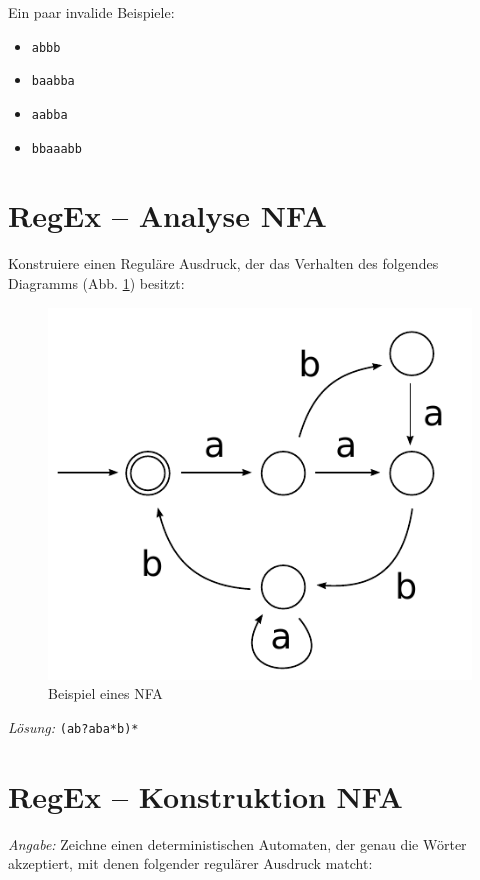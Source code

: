 \documentclass[11pt,a4paper]{article}
\theoremstyle{area}
\begin{document}
Ein paar invalide Beispiele:

\begin{itemize}
  \item \texttt{abbb}
  \item \texttt{baabba}
  \item \texttt{aabba}
  \item \texttt{bbaaabb}
\end{itemize}

\section{RegEx -- Analyse NFA}

Konstruiere einen Reguläre Ausdruck, der das Verhalten des folgendes
Diagramms (Abb. \ref{fig:nfa_1}) besitzt:

\begin{figure}[!ht]
  \begin{center}
    \includegraphics{nfa_1.pdf}
    \caption{Beispiel eines NFA}
    \label{fig:nfa_1}
  \end{center}
\end{figure}

\emph{Lösung:} \texttt{(ab?aba*b)*}

\section{RegEx -- Konstruktion NFA}

\emph{Angabe:} Zeichne einen deterministischen Automaten, der genau die
    Wörter akzeptiert, mit denen folgender regulärer Ausdruck matcht:
\end{document}
